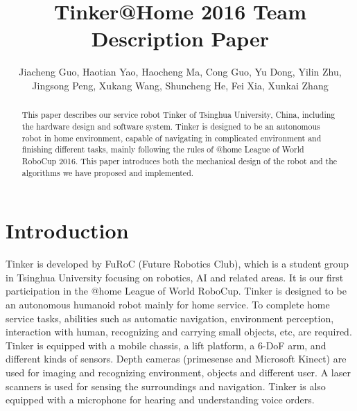 \documentclass[runningheads,a4paper]{llncs}
\begin{document}
	
\title{Tinker@Home 2016 Team Description Paper}
\author{Jiacheng Guo, Haotian Yao, Haocheng Ma, Cong Guo, Yu Dong, Yilin Zhu, Jingsong Peng, Xukang Wang, Shuncheng He, Fei Xia, Xunkai Zhang}
\maketitle


\begin{abstract}
This paper describes our service robot Tinker of Tsinghua University, China, including the hardware design and software system. Tinker is designed to be an autonomous robot in home environment, capable of navigating in complicated environment and finishing different tasks, mainly following the rules of @home League of World RoboCup 2016. This paper introduces both the mechanical design of the robot and the algorithms we have proposed and implemented.
\end{abstract}



\section{Introduction}
Tinker is developed by FuRoC (Future Robotics Club), which is a student group in Tsinghua University focusing on robotics, AI and related areas. It is our first participation in the @home League of World RoboCup. Tinker is designed to be an autonomous humanoid robot mainly for home service. To complete home service tasks, abilities such as automatic navigation, environment perception, interaction with human, recognizing and carrying small objects, etc, are required. Tinker is equipped with a mobile chassis, a lift platform, a 6-DoF arm, and different kinds of sensors. Depth cameras (primesense and Microsoft Kinect) are used for imaging and recognizing environment, objects and different user. A laser scanners is used for sensing the surroundings and navigation. Tinker is also equipped with a microphone for hearing and understanding voice orders.
\end{document}
